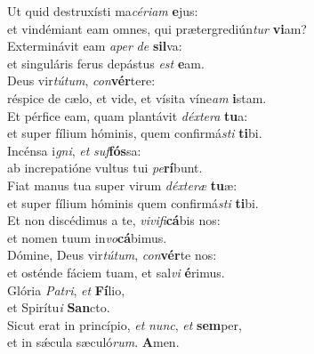 \oddverse Ut quid destruxísti ma\textit{cé}\textit{ri}\textit{am} \textbf{e}jus:~\*\\
\oddverse et vindémiant eam omnes, qui prætergrediún\textit{tur} \textbf{vi}am?\\
\evenverse Exterminávit eam \textit{a}\textit{per} \textit{de} \textbf{sil}va:~\*\\
\evenverse et singuláris ferus depástus \textit{est} \textbf{e}am.\\
\oddverse Deus vir\textit{tú}\textit{tum}, \textit{con}\textbf{vér}tere:~\*\\
\oddverse réspice de cælo, et vide, et vísita víne\textit{am} \textbf{i}stam.\\
\evenverse Et pérfice eam, quam plantávit \textit{déx}\textit{te}\textit{ra} \textbf{tu}a:~\*\\
\evenverse et super fílium hóminis, quem confirmá\textit{sti} \textbf{ti}bi.\\
\oddverse Incénsa i\textit{gni}, \textit{et} \textit{suf}\textbf{fós}sa:~\*\\
\oddverse ab increpatióne vultus tui \textit{pe}\textbf{rí}bunt.\\
\evenverse Fiat manus tua super virum \textit{déx}\textit{te}\textit{ræ} \textbf{tu}æ:~\*\\
\evenverse et super fílium hóminis quem confirmá\textit{sti} \textbf{ti}bi.\\
\oddverse Et non discédimus a te, \textit{vi}\textit{vi}\textit{fi}\textbf{cá}bis nos:~\*\\
\oddverse et nomen tuum in\textit{vo}\textbf{cá}bimus.\\
\evenverse Dómine, Deus vir\textit{tú}\textit{tum}, \textit{con}\textbf{vér}te nos:~\*\\
\evenverse et osténde fáciem tuam, et sal\textit{vi} \textbf{é}rimus.\\
\oddverse Glória \textit{Pa}\textit{tri}, \textit{et} \textbf{Fí}lio,~\*\\
\oddverse et Spirítu\textit{i} \textbf{San}cto.\\
\evenverse Sicut erat in princípio, \textit{et} \textit{nunc}, \textit{et} \textbf{sem}per,~\*\\
\evenverse et in sǽcula sæculó\textit{rum}. \textbf{A}men.\\
